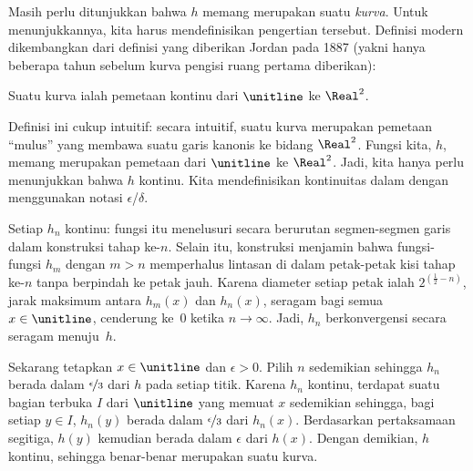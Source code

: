 \documentclass[../../../include/open-logic-section]{subfiles}
\begin{document}
Masih perlu ditunjukkan bahwa $h$ memang merupakan suatu \emph{kurva}. Untuk
menunjukkannya, kita harus mendefinisikan pengertian tersebut. Definisi
modern dikembangkan dari definisi yang diberikan Jordan pada 1887 (yakni
hanya beberapa tahun sebelum kurva pengisi ruang pertama diberikan):

\begin{defn}
Suatu kurva ialah pemetaan kontinu dari $\unitline$ ke $\Real^2$.
\end{defn}

Definisi ini cukup intuitif: secara intuitif, suatu kurva merupakan pemetaan
``mulus'' yang membawa suatu garis kanonis ke bidang $\Real^2$. Fungsi
kita, $h$, memang merupakan pemetaan dari $\unitline$ ke $\Real^2$. Jadi,
kita hanya perlu menunjukkan bahwa $h$ kontinu. Kita mendefinisikan
kontinuitas dalam  dengan menggunakan notasi
$\epsilon$/$\delta$.

Setiap $h_n$ kontinu: fungsi itu menelusuri secara berurutan segmen-segmen
garis dalam konstruksi tahap ke-$n$. Selain itu, konstruksi menjamin bahwa
fungsi-fungsi $h_m$ dengan $m>n$ memperhalus lintasan di dalam petak-petak
kisi tahap ke-$n$ tanpa berpindah ke petak jauh. Karena diameter setiap
petak ialah $2^{(\frac{1}{2}-n)}$, jarak maksimum antara $h_m(x)$ dan
$h_n(x)$, seragam bagi semua $x\in\unitline$, cenderung ke~$0$ ketika
$n\to\infty$. Jadi, $h_n$ berkonvergensi secara seragam menuju~$h$.

Sekarang tetapkan $x\in\unitline$ dan $\epsilon>0$. Pilih $n$ sedemikian
sehingga $h_n$ berada dalam $\nicefrac{\epsilon}{3}$ dari $h$ pada setiap
titik. Karena $h_n$ kontinu, terdapat suatu bagian terbuka $I$ dari
$\unitline$ yang memuat $x$ sedemikian sehingga, bagi setiap $y\in I$,
$h_n(y)$ berada dalam $\nicefrac{\epsilon}{3}$ dari $h_n(x)$. Berdasarkan
pertaksamaan segitiga, $h(y)$ kemudian berada dalam $\epsilon$ dari $h(x)$.
Dengan demikian, $h$ kontinu, sehingga benar-benar merupakan suatu kurva.
\end{document}
